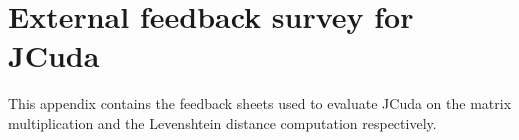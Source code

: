 \chapter{External feedback survey for JCuda} \label{jcuda code}

This appendix contains the feedback sheets used to evaluate JCuda on the matrix multiplication and the Levenshtein distance computation respectively.






